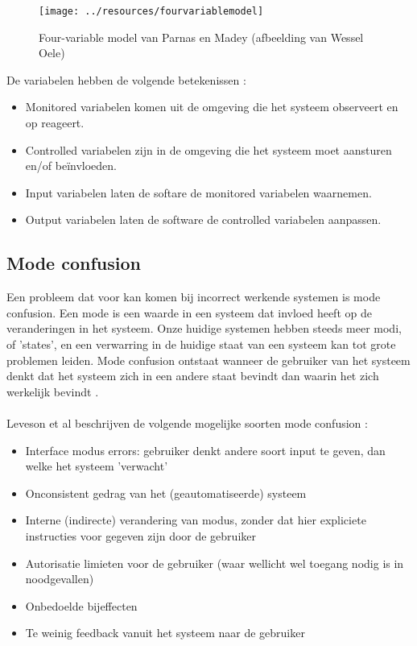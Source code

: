 \documentclass{article}
\begin{document}
    \begin{figure}[h]
      \centering
      \texttt{[image: ../resources/fourvariablemodel]}
      \caption{Four-variable model van Parnas en Madey (afbeelding van Wessel Oele)}
      \label{fig:fourvariablemodel}
    \end{figure}

    De variabelen hebben de volgende betekenissen \cite{miller2001extending}:
    \begin{itemize}
      \item Monitored variabelen komen uit de omgeving die het systeem observeert en op reageert.
      \item Controlled variabelen zijn in de omgeving die het systeem moet aansturen en/of beïnvloeden.
      \item Input variabelen laten de softare de monitored variabelen waarnemen.
      \item Output variabelen laten de software de controlled variabelen aanpassen.
    \end{itemize}

  \subsection{Mode confusion}
    Een probleem dat voor kan komen bij incorrect werkende systemen is mode confusion. Een mode is een waarde in een systeem dat invloed heeft op de veranderingen in het systeem. Onze huidige systemen hebben steeds meer modi, of 'states', en een verwarring in de huidige staat van een systeem kan tot grote problemen leiden. Mode confusion ontstaat wanneer de gebruiker van het systeem denkt dat het systeem zich in een andere staat bevindt dan waarin het zich werkelijk bevindt \cite{leveson1997analyzing}. \\\\
    Leveson et al beschrijven de volgende mogelijke soorten mode confusion \cite{leveson1997analyzing}:
    \begin{itemize}
      \item Interface modus errors: gebruiker denkt andere soort input te geven, dan welke het systeem 'verwacht'
      \item Onconsistent gedrag van het (geautomatiseerde) systeem
      \item Interne (indirecte) verandering van modus, zonder dat hier expliciete instructies voor gegeven zijn door de gebruiker
      \item Autorisatie limieten voor de gebruiker (waar wellicht wel toegang nodig is in noodgevallen)
      \item Onbedoelde bijeffecten
      \item Te weinig feedback vanuit het systeem naar de gebruiker
    \end{itemize}
\end{document}
